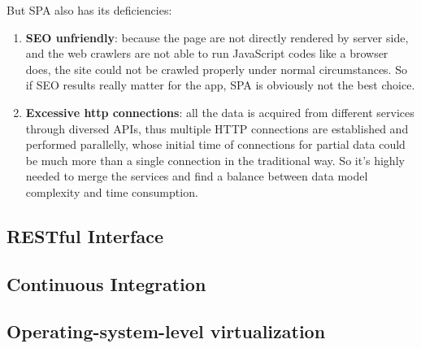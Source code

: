 But SPA also has its deficiencies:

\begin{enumerate}
\item
\textbf{\gls{SEO} unfriendly}: because the page are not directly rendered by server side, and the web crawlers are not able to run JavaScript codes like a browser does, the site could not be crawled properly under normal circumstances. So if SEO results really matter for the app, SPA is obviously not the best choice.
\item
\textbf{Excessive http connections}: all the data is acquired from different services through diversed \gls{API}s, thus multiple HTTP connections are established and performed parallelly, whose initial time of connections for partial data could be much more than a single connection in the traditional way. So it's highly needed to merge the services and find a balance between data model complexity and time consumption.
\end{enumerate}


\subsection{RESTful Interface}



\subsection{Continuous Integration}



\subsection{Operating-system-level virtualization}
